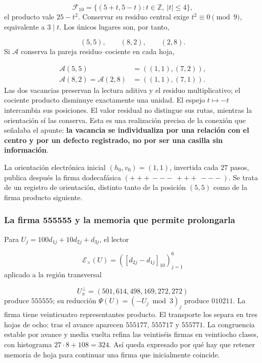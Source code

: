 \[
\mathcal F_{10}=\{(5+t,5-t):t\in\mathbb Z,\ |t|\leq4\},
\]
el producto vale \(25-t^2\). Conservar su residuo central exige \(t^2\equiv0\pmod9\), equivalente a \(3\mid t\). Los únicos lugares son, por tanto,

\[
(5,5),\qquad(8,2),\qquad(2,8).
\]
Si \(\mathcal A\) conserva la pareja residuo–cociente en cada hoja,

\[
\begin{aligned}
\mathcal A(5,5)&=((1,1),(7,2)),\\
\mathcal A(8,2)=\mathcal A(2,8)&=((1,1),(7,1)).
\end{aligned}
\]
Las dos vacancias preservan la lectura aditiva y el residuo multiplicativo; el cociente producto disminuye exactamente una unidad. El espejo \(t\mapsto-t\) intercambia sus posiciones. El valor residual no distingue sus rutas, mientras la orientación sí las conserva. Esta es una realización precisa de la conexión que señalaba el apunte: \textbf{la vacancia se individualiza por una relación con el centro y por un defecto registrado, no por ser una casilla sin información}.

La orientación electrónica inicial \((h_0,v_0)=(1,1)\), invertida cada \(27\) pasos, publica después la firma dodecafásica \((+++\,---\,+++\,---)\). Se trata de un registro de orientación, distinto tanto de la posición \((5,5)\) como de la firma producto siguiente.

\subsubsection*{La firma 555555 y la memoria que permite prolongarla}
Para \(U_j=100d_{1j}+10d_{2j}+d_{3j}\), el lector

\[
\mathcal E_\times(U)=([d_{2j}-d_{1j}]_{10})_{j=1}^{6}
\]
aplicado a la región transversal

\[
U_\pi^\perp=(501,614,498,169,272,272)
\]
produce \(555555\); su reducción \(\Psi(U)=(-U_j\bmod3)_j\) produce \(010211\). La firma tiene veinticuatro representantes producto. El transporte los separa en tres hojas de ocho: tras el avance aparecen \(555177\), \(555717\) y \(555771\). La congruencia estable por avance y media vuelta refina las veintiséis firmas en veintiocho clases, con histograma \(27\cdot8+108=324\). Así queda expresado por qué hay que retener memoria de hoja para continuar una firma que inicialmente coincide.


